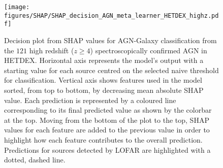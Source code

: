 \documentclass{aa}
\begin{document}
\begin{figure}[t]
    \centering
    \begin{minipage}{0.75\columnwidth}
    \texttt{[image: figures/SHAP/SHAP\_decision\_AGN\_meta\_learner\_HETDEX\_highz.pdf]}
    \end{minipage}%
    \caption{Decision plot from SHAP values for AGN-Galaxy classification from the $121$ high redshift ($z \geq 4$) spectroscopically confirmed AGN in HETDEX. Horizontal axis represents the model's output with a starting value for each source centred on the selected naive threshold for classification. Vertical axis shows features used in the model sorted, from top to bottom, by decreasing mean absolute SHAP value. Each prediction is represented by a coloured line corresponding to its final predicted value as shown by the colorbar at the top. Moving from the bottom of the plot to the top, SHAP values for each feature are added to the previous value in order to highlight how each feature contributes to the overall prediction. Predictions for sources detected by LOFAR are highlighted with a dotted, dashed line.}
   \label{fig:SHAP_decision_AGN_meta_HETDEX_high_z}
\end{figure}
\end{document}
